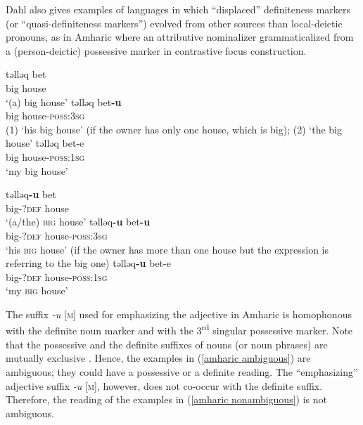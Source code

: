 {
Dahl also gives examples of languages in which “displaced” definiteness markers (or “quasi-definiteness markers”) evolved from other sources than local\hyp{}deictic pronouns, as in Amharic where an attributive nominalizer grammaticalized from a (person-deictic) possessive marker in contrastive focus construction.
\begin{exe}
\ex	{}
\begin{xlist}
\begin{xlist}
\ex
\gll	təlləq bet\\
	big	house\\								
\glt	‘(a) big house’
\ex	
\label{amharic ambiguous}
\gll	təlləq bet\textbf{-u}\\
	big house-\textsc{poss:3sg}\\
\glt	(1) ‘his big house’ (if the owner has only one house, which is big); (2) ‘the big house’
\ex
\gll	təlləq bet-e\\
	big house-\textsc{poss:1sg}\\
\glt	‘my big house’
\end{xlist}
\begin{xlist}
\ex	
\gll	təlləq\textbf{-u} bet\\
	big-\textsc{?def} house\\
\glt	‘(a/the) \textsc{big} house’
\ex	
\label{amharic nonambiguous}
\gll	təlləq\textbf{-u} bet\textbf{-u}\\
	big-\textsc{?def} house-\textsc{poss:3sg}\\
\glt	‘his \textsc{big} house’ (if the owner has more than one house but the expression is referring to the big one)
\ex
\gll	təlləq\textbf{-u} bet-e\\
	big-\textsc{?def} house-\textsc{poss:1sg}\\
\glt	‘my \textsc{big} house’
\end{xlist}
\end{xlist}
\end{exe}

The suffix \textit{-u} [\textsc{m}] used for emphasizing the adjective in Amharic is homophonous with the definite noun marker and with the 3\textsuperscript{rd} singular possessive marker. Note that the possessive and the definite suffixes of nouns (or noun phrases) are mutually exclusive \citep[463]{hudson1997}. Hence, the examples in (\ref{amharic ambiguous}) are ambiguous; they could have a possessive or a definite reading. The “emphasizing” adjective suffix \textit{-u} [\textsc{m}], however, does not co-occur with the definite suffix. Therefore, the reading of the examples in (\ref{amharic nonambiguous}) is not ambiguous.

}

